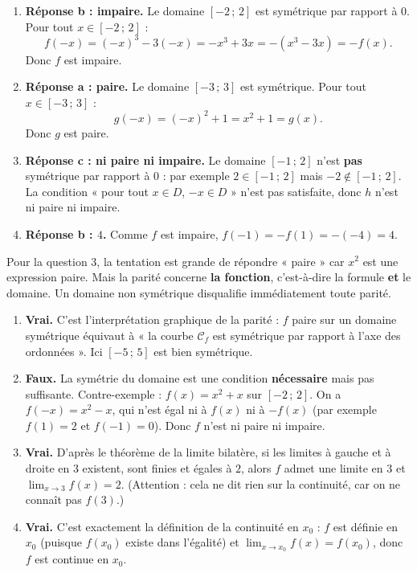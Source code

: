 \documentclass[11pt]{article}
\begin{document}
\begin{corrige}
\begin{enumerate}
\item \textbf{Réponse b : impaire.} Le domaine $[-2\,;\,2]$ est symétrique par rapport à $0$. Pour tout $x\in[-2\,;\,2]$ :
\[ f(-x)=(-x)^3-3(-x)=-x^3+3x=-(x^3-3x)=-f(x). \]
Donc $f$ est impaire.
\item \textbf{Réponse a : paire.} Le domaine $[-3\,;\,3]$ est symétrique. Pour tout $x\in[-3\,;\,3]$ :
\[ g(-x)=(-x)^2+1=x^2+1=g(x). \]
Donc $g$ est paire.
\item \textbf{Réponse c : ni paire ni impaire.} Le domaine $[-1\,;\,2]$ n'est \textbf{pas} symétrique par rapport à $0$ : par exemple $2\in[-1\,;\,2]$ mais $-2\notin[-1\,;\,2]$. La condition « pour tout $x\in D$, $-x\in D$ » n'est pas satisfaite, donc $h$ n'est ni paire ni impaire.
\item \textbf{Réponse b : $4$.} Comme $f$ est impaire, $f(-1)=-f(1)=-(-4)=4$.
\end{enumerate}
\end{corrige}

\begin{attention}
Pour la question 3, la tentation est grande de répondre « paire » car $x^2$ est une expression paire. Mais la parité concerne \textbf{la fonction}, c'est-à-dire la formule \textbf{et} le domaine. Un domaine non symétrique disqualifie immédiatement toute parité.
\end{attention}

\begin{corrige}
\begin{enumerate}
\item \textbf{Vrai.} C'est l'interprétation graphique de la parité : $f$ paire sur un domaine symétrique équivaut à « la courbe $\mathcal{C}_f$ est symétrique par rapport à l'axe des ordonnées ». Ici $[-5\,;\,5]$ est bien symétrique.
\item \textbf{Faux.} La symétrie du domaine est une condition \textbf{nécessaire} mais pas suffisante. Contre-exemple : $f(x)=x^2+x$ sur $[-2\,;\,2]$. On a $f(-x)=x^2-x$, qui n'est égal ni à $f(x)$ ni à $-f(x)$ (par exemple $f(1)=2$ et $f(-1)=0$). Donc $f$ n'est ni paire ni impaire.
\item \textbf{Vrai.} D'après le théorème de la limite bilatère, si les limites à gauche et à droite en $3$ existent, sont finies et égales à $2$, alors $f$ admet une limite en $3$ et $\lim_{x\to 3}f(x)=2$. (Attention : cela ne dit rien sur la continuité, car on ne connaît pas $f(3)$.)
\item \textbf{Vrai.} C'est exactement la définition de la continuité en $x_0$ : $f$ est définie en $x_0$ (puisque $f(x_0)$ existe dans l'égalité) et $\lim_{x\to x_0}f(x)=f(x_0)$, donc $f$ est continue en $x_0$.
\end{enumerate}
\end{corrige}
\end{document}
